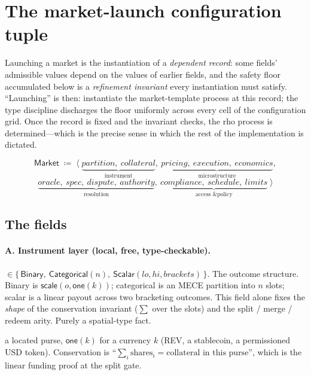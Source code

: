 \documentclass[11pt]{article}
\begin{document}
\section{The market-launch configuration tuple}\label{sec:tuple}

Launching a market is the instantiation of a \emph{dependent record}: some fields' admissible
values depend on the values of earlier fields, and the safety floor accumulated below is a
\emph{refinement invariant} every instantiation must satisfy. ``Launching'' is then:
instantiate the market-template process at this record; the type discipline discharges the
floor uniformly across every cell of the configuration grid. Once the record is fixed and the
invariant checks, the rho process is determined---which is the precise sense in which the rest
of the implementation is dictated.

\[
\mathsf{Market} \;\coloneqq\; \big\langle\;
\underbrace{\mathit{partition},\ \mathit{collateral}}_{\text{instrument}},\
\underbrace{\mathit{pricing},\ \mathit{execution},\ \mathit{economics}}_{\text{microstructure}},
\]
\[
\underbrace{\mathit{oracle},\ \mathit{spec},\ \mathit{dispute},\ \mathit{authority}}_{\text{resolution}},\
\underbrace{\mathit{compliance},\ \mathit{schedule},\ \mathit{limits}}_{\text{access \& policy}}
\;\big\rangle
\]

\subsection{The fields}

\paragraph{A. Instrument layer (local, free, type-checkable).}
\begin{description}[leftmargin=1.4em,itemsep=0.2em]
\item[\textit{partition}] $\in \{\,\mathsf{Binary},\ \mathsf{Categorical}(n),\
\mathsf{Scalar}(\mathit{lo},\mathit{hi},\mathit{brackets})\,\}$. The outcome structure. Binary
is $\textsf{scale}(o,\textsf{one}(k))$; categorical is an MECE partition into $n$ slots;
scalar is a linear payout across two bracketing outcomes. This field alone fixes the
\emph{shape} of the conservation invariant ($\sum$ over the slots) and the \textsf{split} /
\textsf{merge} / \textsf{redeem} arity. Purely a spatial-type fact.
\item[\textit{collateral}] a located purse, $\textsf{one}(k)$ for a currency $k$ (REV, a
stablecoin, a permissioned USD token). Conservation is ``$\sum_i \text{shares}_i =
\text{collateral in this purse}$'', which is the linear funding proof at the \textsf{split}
gate.
\end{description}
\end{document}
